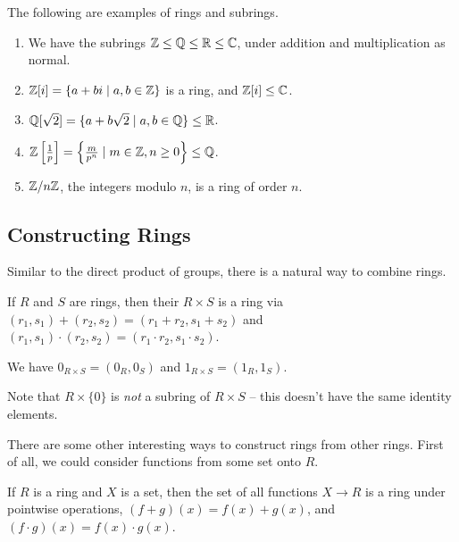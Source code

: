 \documentclass[a4paper]{scrartcl}
\begin{document}
 \begin{example}
	 The following are examples of rings and subrings.
	 \begin{enumerate}[label=(\roman*)]
		 \item We have the subrings $\mathbb{Z} \leq \mathbb{Q} \leq \mathbb{R} \leq \mathbb{C}$, under addition and multiplication as normal.
		 \item $\mathbb{Z}[i] = \{a + bi \mid a, b \in \mathbb{Z}\}$ is a ring, and $\mathbb{Z}[i] \leq \mathbb{C}$.
		 \item $\mathbb{Q}[\sqrt{2}] = \{a + b\sqrt{2} \mid a, b \in \mathbb{Q}\} \leq \mathbb{R}$.
		 \item $\mathbb{Z}\left[\frac{1}{p}\right] = \left\{
			\frac{m}{p^n} \mid m \in \mathbb{Z}, n \geq 0
		 \right\} \leq \mathbb{Q}$.
		\item $\mathbb{Z}/n\mathbb{Z}$, the integers modulo $n$, is a ring of order $n$.
	 \end{enumerate}
 \end{example}


 \subsection{Constructing Rings}

 Similar to the direct product of groups, there is a natural way to combine rings.

 \begin{definition}
	 If $R$ and $S$ are rings, then their  $R \times S$ is a ring via $(r_1, s_1) + (r_2, s_2) = (r_1 + r_2, s_1 + s_2)$ and $(r_1, s_1) \cdot (r_2, s_2) = (r_1 \cdot r_2, s_1 \cdot s_2)$.

	We have $0_{R \times S} = (0_R, 0_S)$ and $1_{R \times S} = (1_R, 1_S)$.
 \end{definition}

 \begin{remark}
	 Note that $R \times \{0 \}$ is \emph{not} a subring of $R \times S$ -- this doesn't have the same identity elements.
 \end{remark}

 There are some other interesting ways to construct rings from other rings. First of all, we could consider functions from some set onto $R$.

 \begin{definition}
	If $R$ is a ring and $X$ is a set, then the set of all functions $X \rightarrow R$ is a ring under pointwise operations, $(f + g)(x) = f(x) + g(x)$, and $(f \cdot g)(x) = f(x) \cdot g(x)$.  
 \end{definition}
\end{document}
